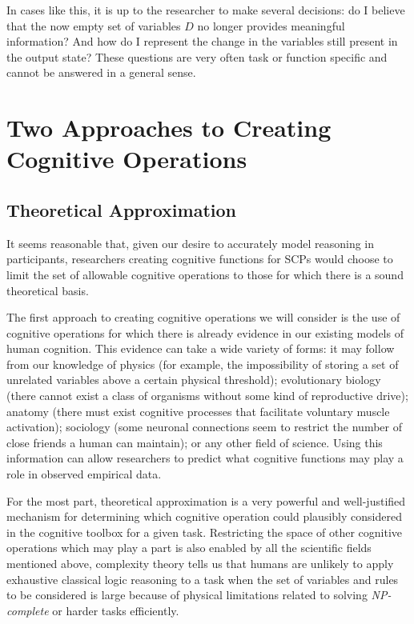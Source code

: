 {In cases like this, it is up to the researcher to make several decisions: do I believe that the now empty set of variables $D$ no longer provides meaningful information? And how do I represent the change in the variables still present in the output state? These questions are very often task or function specific and cannot be answered in a general sense.

\section{Two Approaches to Creating Cognitive Operations}
\subsection{Theoretical Approximation}
It seems reasonable that, given our desire to accurately model reasoning in participants, researchers creating cognitive functions for SCPs would choose to limit the set of allowable cognitive operations to those for which there is a sound theoretical basis.

The first approach to creating cognitive operations we will consider is the use of cognitive operations for which there is already evidence in our existing models of human cognition. This evidence can take a wide variety of forms: it may follow from our knowledge of physics (for example, the impossibility of storing a set of unrelated variables above a certain physical threshold); evolutionary biology (there cannot exist a class of organisms without some kind of reproductive drive); anatomy (there must exist cognitive processes that facilitate voluntary muscle activation); sociology (some neuronal connections seem to restrict the number of close friends a human can maintain\citep{gonccalves2011modeling}); or any other field of science. Using this information can allow researchers to predict what cognitive functions may play a role in observed empirical data. 

For the most part, theoretical approximation is a very powerful and well-justified mechanism for determining which cognitive operation could plausibly considered in the cognitive toolbox for a given task. Restricting the space of other cognitive operations which may play a part is also enabled by all the scientific fields mentioned above, complexity theory tells us that humans are unlikely to apply exhaustive classical logic reasoning to a task when the set of variables and rules to be considered is large because of physical limitations related to solving \textit{NP-complete} or harder tasks efficiently.

}
